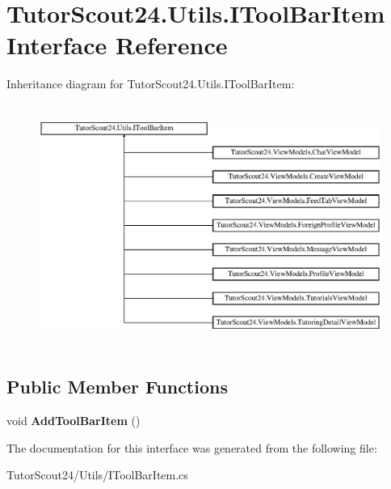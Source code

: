 \hypertarget{interface_tutor_scout24_1_1_utils_1_1_i_tool_bar_item}{}\section{Tutor\+Scout24.\+Utils.\+I\+Tool\+Bar\+Item Interface Reference}
\label{interface_tutor_scout24_1_1_utils_1_1_i_tool_bar_item}
Inheritance diagram for Tutor\+Scout24.\+Utils.\+I\+Tool\+Bar\+Item\+:\begin{figure}[H]
\begin{center}
\leavevmode
\includegraphics[height=7.974683cm]{interface_tutor_scout24_1_1_utils_1_1_i_tool_bar_item}
\end{center}
\end{figure}
\subsection*{Public Member Functions}
\begin{DoxyCompactItemize}
\item 
\mbox{\label{interface_tutor_scout24_1_1_utils_1_1_i_tool_bar_item_a46480b73dc46338a4d00acee24422273}} 
void {\bfseries Add\+Tool\+Bar\+Item} ()
\end{DoxyCompactItemize}


The documentation for this interface was generated from the following file\+:\begin{DoxyCompactItemize}
\item 
Tutor\+Scout24/\+Utils/I\+Tool\+Bar\+Item.\+cs\end{DoxyCompactItemize}

